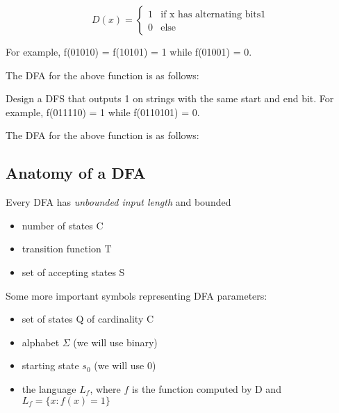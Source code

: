 \begin{example}
    \begin{equation}
        D(x) = 
        \begin{cases}
            1 & \text{if x has alternating bits} 1 \\
            0 & \text{else}
        \end{cases}
    \end{equation}

    For example, f(01010) = f(10101) = 1 while f(01001) = 0.

    The DFA for the above function is as follows:
    \begin{center}
    \end{center}
\end{example}

\begin{example}
    Design a DFS that outputs 1 on strings with the same start and end bit. For example, f(011110) = 1 while f(0110101) = 0.

    The DFA for the above function is as follows:
    \begin{center}
    \end{center}
\end{example}

\subsection*{Anatomy of a DFA}
Every DFA has \emph{unbounded input length} and bounded
\begin{itemize}
    \item number of states C
    \item transition function T
    \item set of accepting states S
\end{itemize}

Some more important symbols representing DFA parameters:
\begin{itemize}
    \item set of states Q of cardinality C
    \item alphabet $\Sigma$ (we will use binary)
    \item starting state $s_0$ (we will use 0)
    \item the language $L_f$, where $f$ is the function computed by D and $L_f = \{x: f(x) = 1\}$
\end{itemize}


